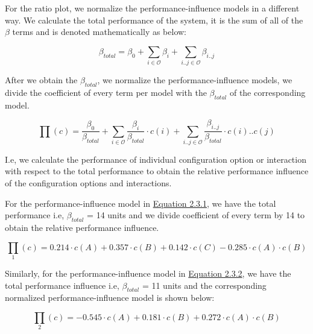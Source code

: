 \begin{description}[leftmargin=0pt]
  \item[Normalization: ] For the ratio plot, we normalize the performance-influence models in a different way. We calculate the total performance of the system, it is the sum of all of the $\beta$ terms and is denoted mathematically as below:

\begin{equation*}
     \beta_{total} = \beta_{0} + \sum_{i \in \mathcal{O}}   {\beta_{\textit{i}}} + \sum_{i..j \in \mathcal{O}} {\beta_{\textit{i..j}}}
  \tag{2.3.7}\label{eq:2.3.7} 
\end{equation*}

After we obtain the $ \beta_{total}$, we normalize the performance-influence models, we divide the coefficient of every term per model with the $\beta_{total}$ of the corresponding model.

\begin{equation*}
  \prod {(c)} = \frac{\beta_{\mathrm{0}}}{\beta_{total}}  + \sum_{i \in \mathcal{O}} \frac{\beta_{\textit{i}}}{\beta_{total}} \cdot {c(i)} + 
 \sum_{i..j \in \mathcal{O}} 
 \frac{\beta_{\textit{i..j}}}{\beta_{total}} \cdot c(i)..c(j)
  \tag{2.3.8}\label{eq:2.3.8} 
\end{equation*}

I.e, we calculate the performance of individual configuration option or interaction with respect to the total performance to obtain the relative performance influence of the configuration options and interactions.

  
 For the performance-influence model in \hyperref[eq:2.3.1]{Equation 2.3.1}, we have the total performance i.e, $\beta_{total}$ = 14 units and we divide coefficient of every term by 14 to obtain the relative performance influence.

\begin{equation*}
  \prod_1{(c)} = 0.214 \cdot c(A) + 0.357  \cdot c(B) + 0.142 \cdot c(C) - 0.285 \cdot  c(A) \cdot c(B)
   \tag{2.3.9}\label{eq:2.3.9}
\end{equation*}

Similarly, for the performance-influence model in \hyperref[eq:2.3.2]{Equation 2.3.2}, we have the total performance influence i.e, $\beta_{total}$ = 11 units and the corresponding normalized performance-influence model is shown below:

\begin{equation*}
  \prod_2{(c)} = - 0.545 \cdot c(A) + 0.181 \cdot c(B) + 0.272 \cdot  c(A) \cdot c(B)
   \tag{2.3.10}\label{eq:2.3.10}
\end{equation*}


\end{description}
